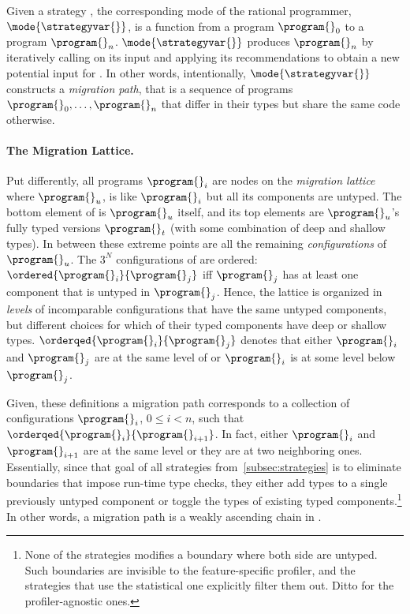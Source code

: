 
Given a strategy \strategyvar{}, the corresponding mode of the rational
programmer, $\mode{\strategyvar{}}$, is a function from a program $\program{}_0$
to a program $\program{}_n$. $\mode{\strategyvar{}}$ produces $\program{}_n$ by
iteratively calling \strategyvar{} on its input and applying its recommendations
to obtain a new potential input for \strategyvar{}.  In other words,
intentionally, $\mode{\strategyvar{}}$ constructs a \emph{migration path}, that
is a sequence of programs ${\program{}_0}, \ldots, {\program{}_n}$ that differ in
their types but share the same code otherwise.

\paragraph{The Migration Lattice.}
Put differently, all programs $\program{}_i$ are nodes on the
\emph{migration lattice}  where ${\program{}_u}$, is
like ${\program{}_i}$ but all its components are untyped. The bottom
element of  is ${\program{}_u}$ itself, and its top
elements are ${\program{}_u}$'s fully typed versions $\program{}_t$ (with some
combination of deep and shallow types). In between these extreme points
are all the remaining \emph{configurations} of $\program{}_u$. The $3^N$
configurations of   are ordered:
$\ordered{\program{}_i}{\program{}_j}$ iff $\program{}_j$ has at least one
component that is untyped in $\program{}_j$. Hence, the lattice is
organized in \emph{levels} of incomparable configurations that have the same
untyped components, but different choices for which of their typed
components have deep or shallow types.
$\orderqed{\program{}_i}{\program{}_j}$ denotes that either $\program{}_i$
and $\program{}_j$ are at the same level of  or
$\program{}_i$ is at some level below $\program{}_j$.

Given, these definitions a migration path corresponds to a collection of
configurations  $\program{}_i$, $0 \leq  i < n$, such that
$\orderqed{\program{}_i}{\program{}_{i+1}}$. In fact, either  $\program{}_i$
and $\program{}_{i+1}$ are at the same level or they are at two
neighboring ones.  Essentially, since that goal of all strategies
from~\ref{subsec:strategies} is to eliminate  boundaries that impose
run-time type checks, they either add types to a single previously
untyped component or toggle the types of existing typed
components.\footnote{None of the strategies modifies a boundary where both
side are untyped. Such boundaries are invisible to the feature-specific
profiler, and the strategies that use the statistical one explicitly
filter them out. Ditto for the profiler-agnostic ones.} 
In other words, a migration path is a weakly ascending
chain in .

